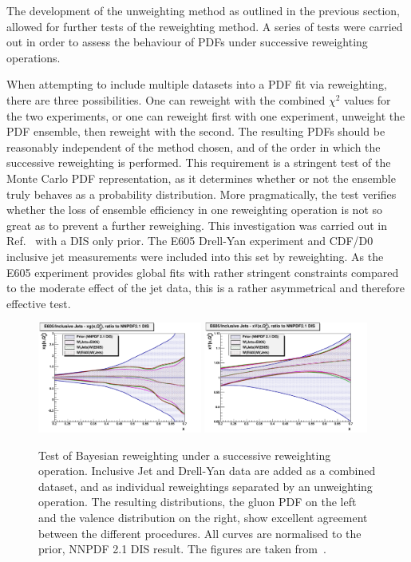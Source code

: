 The development of the unweighting method as outlined in the previous section, allowed for further tests of the reweighting method. A series of tests were carried out in order to assess the behaviour of PDFs under successive reweighting operations.

When attempting to include multiple datasets into a PDF fit via reweighting, there are three possibilities. One can reweight with the combined $\chi^2$ values for the two experiments, or one can reweight first with one experiment, unweight the PDF ensemble, then reweight with the second. The resulting PDFs should be reasonably independent of the method chosen, and of the order in which the successive reweighting is performed. This requirement is a stringent test of the Monte Carlo PDF representation, as it determines whether or not the ensemble truly behaves as a probability distribution. More pragmatically, the test verifies whether the loss of ensemble efficiency in one reweighting operation is not so great as to prevent a further reweighing. This investigation was carried out in Ref.~\cite{Ball:2011gg} with a DIS only prior. The E605 Drell-Yan experiment and CDF/D0 inclusive jet measurements were included into this set by reweighting. As the E605 experiment provides global fits with rather stringent constraints compared to the moderate effect of the jet data, this is a rather asymmetrical and therefore effective test.



\begin{figure}[ht]
\centering
\includegraphics[width=0.48\textwidth]{4-LHCtools/figs/e605-jets_xg_lin_zoom_rel.pdf}
\includegraphics[width=0.48\textwidth]{4-LHCtools/figs/e605-jets_xV_lin_zoom_rel.pdf}
\caption[Test of Bayesian reweighting under a successive reweighting operation]{Test of Bayesian reweighting under a successive reweighting operation. Inclusive Jet and Drell-Yan data are added as a combined dataset, and as individual reweightings separated by an unweighting operation. The resulting distributions, the gluon PDF on the left and the valence distribution on the right, show excellent agreement between the different procedures. All curves are normalised to the prior, NNPDF 2.1 DIS result. The figures are taken from~\cite{Ball:2011gg}.}
\label{fig:SRWvalid}
\end{figure}

